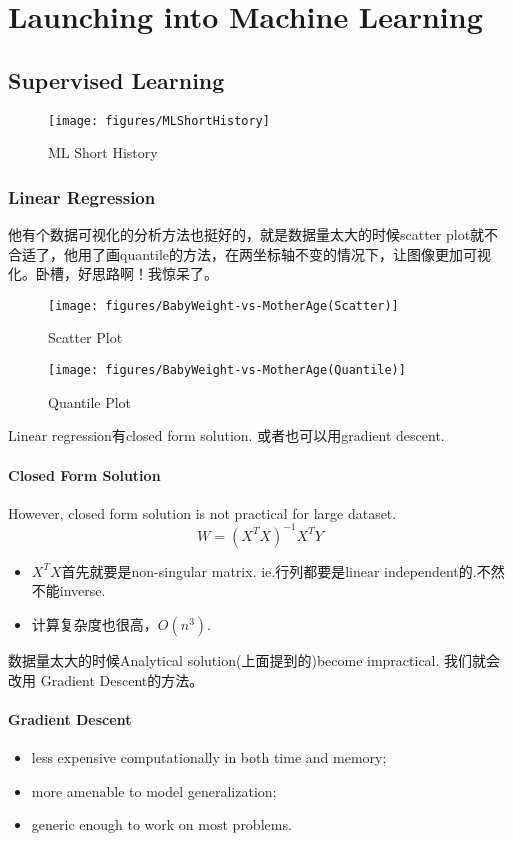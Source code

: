 \chapter{Launching into Machine Learning}
\section{Supervised Learning}

\begin{figure}[H]
	\centering
	\texttt{[image: figures/MLShortHistory]}
	\caption{ML Short History}
\end{figure}

\subsection{Linear Regression}

他有个数据可视化的分析方法也挺好的，就是数据量太大的时候scatter plot就不合适了，他用了画quantile的方法，在两坐标轴不变的情况下，让图像更加可视化。卧槽，好思路啊！我惊呆了。
\begin{figure}[H]
	\centering
	\texttt{[image: figures/BabyWeight-vs-MotherAge(Scatter)]}
	\caption{Scatter Plot}
\end{figure}
\begin{figure}[H]
	\centering
	\texttt{[image: figures/BabyWeight-vs-MotherAge(Quantile)]}
	\caption{Quantile Plot}
\end{figure}



Linear regression有closed form solution. 或者也可以用gradient descent.

\subsubsection{Closed Form Solution}
However, closed form solution is not practical for large dataset.
\[ W=(X^T X)^{-1} X^T Y \]
\begin{itemize}
	\item $ X^T X $首先就要是non-singular matrix. ie.行列都要是linear independent的.不然不能inverse.
	\item 计算复杂度也很高，$ O(n^3) $.
\end{itemize}
数据量太大的时候Analytical solution(上面提到的)become impractical. 我们就会改用 Gradient Descent的方法。


\subsubsection{Gradient Descent}
\begin{itemize}
	\item less expensive computationally in both time and memory;
	\item more amenable to model generalization;
	\item generic enough to work on most problems.
\end{itemize}

